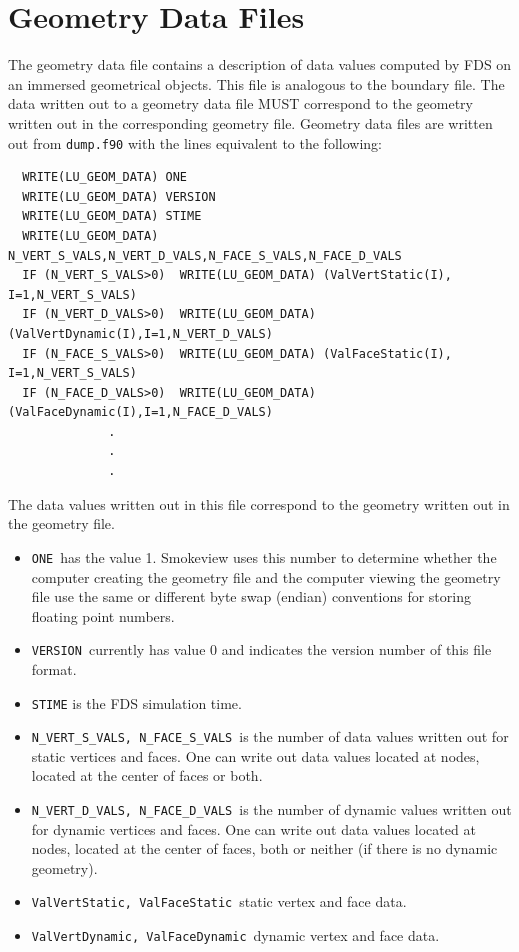 \documentclass[11pt]{book}
\newcommand{\nopart}{\expandafter\def\csname Parent-1\endcsname{}} %
\newcommand{\ct}{\tt\small}
\begin{document}
\section{Geometry Data Files}
\label{out:GEOMETRY_DATA}

The geometry data file contains a description of data values computed by FDS on an immersed
geometrical objects.  This file is analogous to the boundary file.
The data written out to a geometry data file MUST correspond to the geometry written out
in the corresponding geometry file.
Geometry data files are written out from {\ct dump.f90} with the lines equivalent to the following:

\scriptsize
\begin{verbatim}
  WRITE(LU_GEOM_DATA) ONE
  WRITE(LU_GEOM_DATA) VERSION
  WRITE(LU_GEOM_DATA) STIME
  WRITE(LU_GEOM_DATA) N_VERT_S_VALS,N_VERT_D_VALS,N_FACE_S_VALS,N_FACE_D_VALS
  IF (N_VERT_S_VALS>0)  WRITE(LU_GEOM_DATA) (ValVertStatic(I), I=1,N_VERT_S_VALS)
  IF (N_VERT_D_VALS>0)  WRITE(LU_GEOM_DATA) (ValVertDynamic(I),I=1,N_VERT_D_VALS)
  IF (N_FACE_S_VALS>0)  WRITE(LU_GEOM_DATA) (ValFaceStatic(I), I=1,N_VERT_S_VALS)
  IF (N_FACE_D_VALS>0)  WRITE(LU_GEOM_DATA) (ValFaceDynamic(I),I=1,N_FACE_D_VALS)
              .
              .
              .
\end{verbatim}
The data values written out in this file correspond to the geometry written out in the geometry file.
\normalsize
\begin{itemize}
\item {\ct ONE}\ has the value 1.
Smokeview uses this number to
determine whether the computer creating the geometry file and the
computer viewing the geometry file use the same or different byte
swap (endian) conventions for storing floating point numbers.
\item {\ct VERSION}\ currently has value 0 and indicates the version number of this file format.
\item {\ct STIME} is the FDS simulation time.
\item {\ct N\_VERT\_S\_VALS, N\_FACE\_S\_VALS}\ is the number of data values written out for static vertices and faces.  One can write out data values located at nodes, located at the center of faces or both.
\item {\ct N\_VERT\_D\_VALS, N\_FACE\_D\_VALS}\ is the number of dynamic values written out for dynamic vertices and faces.  One can write out
data values located at nodes, located at the center of faces, both or neither (if there is no dynamic geometry).
\item {\ct ValVertStatic, ValFaceStatic}\ static vertex and face data.
\item {\ct ValVertDynamic, ValFaceDynamic}\ dynamic
 vertex and face data.
\end{itemize}



\backmatter
\nopart %


\end{document}
